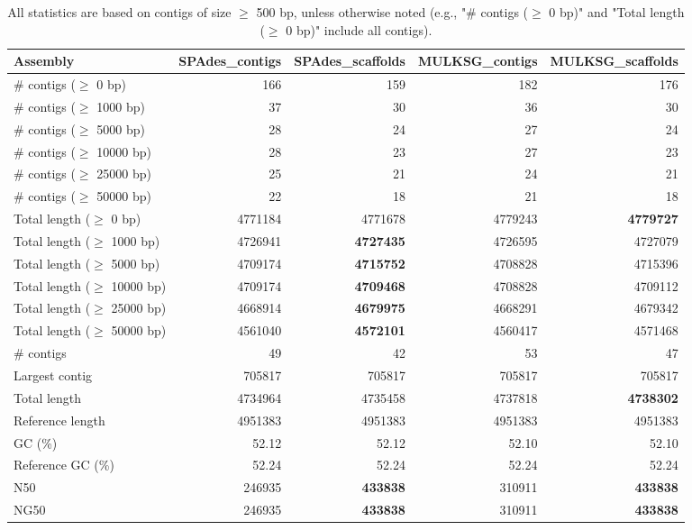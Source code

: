 \documentclass[12pt,a4paper]{article}
\begin{document}
\begin{table}[ht]
\begin{center}
\caption{All statistics are based on contigs of size $\geq$ 500 bp, unless otherwise noted (e.g., "\# contigs ($\geq$ 0 bp)" and "Total length ($\geq$ 0 bp)" include all contigs).}
\begin{tabular}{|l*{4}{|r}|}
\hline
Assembly & SPAdes\_contigs & SPAdes\_scaffolds & MULKSG\_contigs & MULKSG\_scaffolds \\ \hline
\# contigs ($\geq$ 0 bp) & 166 & 159 & 182 & 176 \\ \hline
\# contigs ($\geq$ 1000 bp) & 37 & 30 & 36 & 30 \\ \hline
\# contigs ($\geq$ 5000 bp) & 28 & 24 & 27 & 24 \\ \hline
\# contigs ($\geq$ 10000 bp) & 28 & 23 & 27 & 23 \\ \hline
\# contigs ($\geq$ 25000 bp) & 25 & 21 & 24 & 21 \\ \hline
\# contigs ($\geq$ 50000 bp) & 22 & 18 & 21 & 18 \\ \hline
Total length ($\geq$ 0 bp) & 4771184 & 4771678 & 4779243 & {\bf 4779727} \\ \hline
Total length ($\geq$ 1000 bp) & 4726941 & {\bf 4727435} & 4726595 & 4727079 \\ \hline
Total length ($\geq$ 5000 bp) & 4709174 & {\bf 4715752} & 4708828 & 4715396 \\ \hline
Total length ($\geq$ 10000 bp) & 4709174 & {\bf 4709468} & 4708828 & 4709112 \\ \hline
Total length ($\geq$ 25000 bp) & 4668914 & {\bf 4679975} & 4668291 & 4679342 \\ \hline
Total length ($\geq$ 50000 bp) & 4561040 & {\bf 4572101} & 4560417 & 4571468 \\ \hline
\# contigs & 49 & 42 & 53 & 47 \\ \hline
Largest contig & 705817 & 705817 & 705817 & 705817 \\ \hline
Total length & 4734964 & 4735458 & 4737818 & {\bf 4738302} \\ \hline
Reference length & 4951383 & 4951383 & 4951383 & 4951383 \\ \hline
GC (\%) & 52.12 & 52.12 & 52.10 & 52.10 \\ \hline
Reference GC (\%) & 52.24 & 52.24 & 52.24 & 52.24 \\ \hline
N50 & 246935 & {\bf 433838} & 310911 & {\bf 433838} \\ \hline
NG50 & 246935 & {\bf 433838} & 310911 & {\bf 433838} \\ \hline

\end{tabular}
\end{center}
\end{table}
\end{document}

